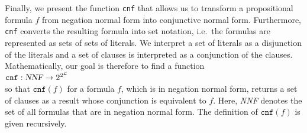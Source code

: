 Finally, we present the function \texttt{cnf} that allows us to transform a propositional formula $f$
from negation normal form into conjunctive normal form.
Furthermore, \texttt{cnf} converts the resulting formula
into set notation, i.e.~the formulas are represented as sets of sets of literals. 
We interpret a set of literals as a
disjunction of the literals and a set of clauses is interpreted as a conjunction
of the clauses.  Mathematically, our goal is therefore to find a function
\\[0.2cm]
\hspace*{1.3cm}
$\texttt{cnf}: \textsl{NNF} \rightarrow 2^{2^{\mathcal{L}}}$
\\[0.2cm]
so that $\texttt{cnf}(f)$ for a formula $f$, which is in negation normal form, returns a set of clauses as a result whose conjunction
is equivalent to $f$.  Here, \textsl{NNF} denotes the set of all formulas that are in negation normal form.  The definition of $\texttt{cnf}(f)$ is given recursively.
